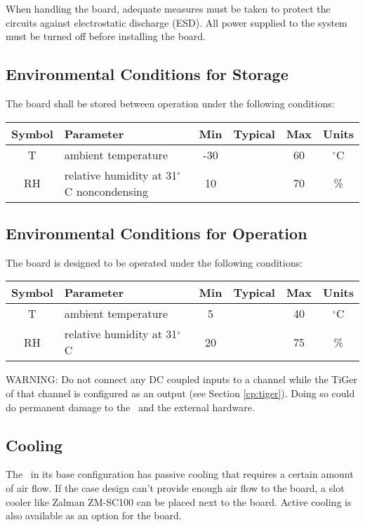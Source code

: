 	When handling the board, adequate measures must be taken to protect the circuits against electrostatic discharge (ESD). All power supplied to the system must be turned off before installing the board.

	\subsection{Environmental Conditions for Storage}

	The board shall be stored between operation under the following conditions:

	\noindent
	\begin{tabularx}{\textwidth}{|c|X|c|c|c|c|}
		\hline
		Symbol & Parameter & Min & Typical & Max & Units\\
		\hline\hline
		T & ambient temperature & -30 && 60 & $^{\circ}$C\\
		\hline
		RH & relative humidity at 31$^{\circ}$C noncondensing & 10 && 70 & \%\\
		\hline
	\end{tabularx}


\subsection{Environmental Conditions for Operation}

	The board is designed to be operated under the following conditions:

	\noindent
	\begin{tabularx}{\textwidth}{|c|X|c|c|c|c|}
		\hline
		Symbol & Parameter & Min & Typical & Max & Units\\
		\hline\hline
		T & ambient temperature & 5 && 40 & $^{\circ}$C\\
		\hline
		RH & relative humidity at 31$^{\circ}$C & 20 && 75 & \%\\
		\hline
	\end{tabularx}

	WARNING: Do not connect any DC coupled inputs to a channel while the TiGer of that channel is configured as an output (see Section \ref{cp:tiger}).
	Doing so could do permanent damage to the \deviceName\ and the external hardware.

\subsection{Cooling}

	The \deviceName\ in its base configuration has passive cooling that requires a certain amount of air flow. 
	If the case design can't provide enough air flow to the board, a slot cooler like Zalman ZM-SC100 can be placed next to the board. 
	Active cooling is also available as an option for the board.


